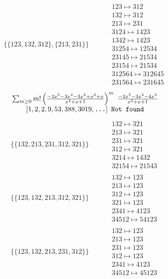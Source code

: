 \begin{tiny}
\begin{align}
\\
\{\{123, 132, 312\}, \{213, 231\}\}
\quad
&
\phantom{.}
&
\begin{matrix}
123 \mapsto 312\\132 \mapsto 312\\213 \mapsto 231\\3124 \mapsto 1423\\1342 \mapsto 1423\\31254 \mapsto 12534\\23145 \mapsto 21534\\23154 \mapsto 21534\\312564 \mapsto 312645\\231564 \mapsto 231645
\end{matrix}
\end{align}
$$
\begin{matrix}
\sum_{m \geq 0} m! \left(
\frac{-2 x^{5} - 3 x^{4} - 3 x^{3} + x^{2} + x}{x^{2} + x + 1}
\right)^m
\ 
\frac{-2 x^{5} - 3 x^{4} - 4 x^{3}}{x^{2} + x + 1}
\\
\left[1, 2, 2, 9, 53, 388, 3019, \text{\texttt{...}}\right]
\ 
\texttt{Not found}
\end{matrix}
$$
\vspace{-1em}
\begin{align}
\{\{132, 213, 231, 312, 321\}\}
\quad
&
\phantom{.}
&
\begin{matrix}
132 \mapsto 321\\213 \mapsto 321\\231 \mapsto 321\\312 \mapsto 321\\3214 \mapsto 1432\\32154 \mapsto 21543
\end{matrix}
\\
\{\{123, 132, 213, 312, 321\}\}
\quad
&
\phantom{.}
&
\begin{matrix}
132 \mapsto 123\\213 \mapsto 123\\312 \mapsto 123\\321 \mapsto 123\\2341 \mapsto 4123\\34512 \mapsto 54123
\end{matrix}
\\
\{\{123, 132, 213, 231, 312\}\}
\quad
&
\phantom{.}
&
\begin{matrix}
132 \mapsto 123\\213 \mapsto 123\\231 \mapsto 123\\312 \mapsto 123\\2341 \mapsto 4123\\34512 \mapsto 45123

\end{matrix}
\end{align}
\end{tiny}
